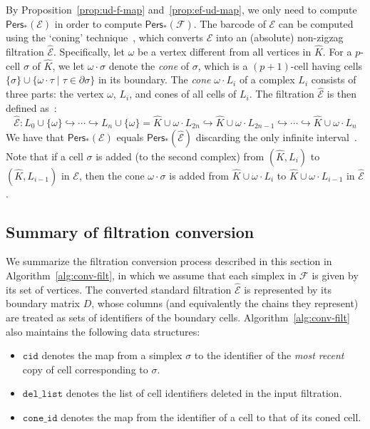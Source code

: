 \documentclass[letterpaper,11pt]{article}
\theoremstyle{mythmstyle}
\theoremstyle{mydefstyle}
\theoremstyle{plain}
\theoremstyle{definition}
\newcommand{\Pers}{\mathsf{Pers}}
\newcommand{\<}[1]{\langle #1\rangle}
\newcommand{\incto}{\hookrightarrow}
\newcommand{\Set}[1]{\{#1\}}
\let\union\cup
\newcommand{\Ecal}{\mathcal{E}}
\newcommand{\Fcal}{\mathcal{F}}
\newcommand{\oG}{\omega}
\newcommand{\sG}{\sigma}
\newcommand{\tG}{\tau}
\newcommand{\Dim}{p}
\newcommand{\simpcnt}{n}
\newcommand{\ucplx}{L}
\newcommand{\ef}{\Ecal}
\begin{document}
By Proposition~\ref{prop:ud-f-map} and~\ref{prop:ef-ud-map}, we
only need to compute $\Pers_*(\ef)$
in order to compute $\Pers_*(\Fcal)$.
The barcode of $\ef$ can be computed using the `coning' technique~\cite{cohen2009extending},
which converts $\ef$ into an (absolute) non-zigzag filtration $\hat{\ef}$.
Specifically, let $\oG$ be a vertex different from all vertices in $\hat{K}$.
For a $\Dim$-cell $\sG$ of $\hat{K}$,
we let $\oG\cdot\sG$ denote the {\it cone} of $\sG$,
which is a $(\Dim+1)$-cell having 
cells $\Set{\sG}\union\Set{\oG\cdot\tG\mid\tG\in\partial\sG}$
in its boundary.
The \emph{cone} $\oG\cdot L_i$ of a complex $L_i$ consists of three parts: 
the vertex $\oG$, $L_i$, and cones of all cells of $L_i$.
The filtration $\hat{\ef}$ is then defined as~\cite{cohen2009extending}:
\[\hat{\ef}:
\ucplx_0\union \Set{\oG}
\incto
\cdots
\incto
\ucplx_{\simpcnt}\union \Set{\oG}
=\hat{K}\union\oG\cdot\ucplx_{2\simpcnt}
\incto
\hat{K}\union\oG\cdot\ucplx_{2\simpcnt-1}
\incto
\cdots
\incto
\hat{K}\union\oG\cdot\ucplx_{\simpcnt}
\]
We have that $\Pers_*(\ef)$ equals $\Pers_*(\hat{\ef})$
discarding the only infinite interval~\cite{cohen2009extending}.
Note that if a cell $\sG$ is added (to the second complex) 
from $(\hat{K},\ucplx_{i})$ to $(\hat{K},\ucplx_{i-1})$ in $\ef$,
then the cone $\oG\cdot\sG$ is added 
from $\hat{K}\union\oG\cdot\ucplx_{i}$ to $\hat{K}\union\oG\cdot\ucplx_{i-1}$ in $\hat{\ef}$.

\subsection{Summary of filtration conversion}
\label{sec:conv-summ}



We summarize the filtration conversion process described in this section
in Algorithm~\ref{alg:conv-filt},
in which we assume that each simplex in $\Fcal$ is given
by its set of vertices.
The converted standard filtration $\hat{\ef}$
is represented 
by its boundary matrix $D$, whose columns (and equivalently the chains they represent)
are treated as sets of identifiers of the boundary cells.
Algorithm~\ref{alg:conv-filt} also maintains the following data structures:
\begin{itemize}
    \item 
    $\mathtt{cid}$ denotes the map from a simplex $\sG$
    to the identifier of the \emph{most recent} copy of cell corresponding to $\sG$.
    \item 
    $\mathtt{del\_list}$ denotes the list of cell identifiers deleted in the input filtration.
    \item 
    $\mathtt{cone\_id}$ denotes the map from the identifier of a cell
    to that of its coned cell.
\end{itemize}
\end{document}
